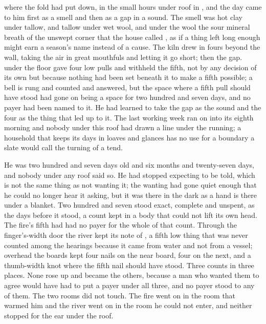 
 where the fold had put  down, in the small hours under  roof in , and the day came to him first as a smell and then as a gap in a sound. The smell was hot clay under tallow, and tallow under wet wool, and under the wool the sour mineral breath of the unswept corner that the house called , as if a thing left long enough might earn a season's name instead of a cause. The kiln drew in fours beyond the wall, taking the air in great mouthfuls and letting it go short; then the gap.  under the floor gave four low pulls and withheld the fifth, not by any decision of its own but because nothing had been set beneath it to make a fifth possible; a bell is rung and counted and answered, but the space where a fifth pull should have stood had gone on being a space for two hundred and seven days, and no payer had been named to it. He had learned to take the gap as the sound and the four as the thing that led up to it. The last working week ran on into its eighth morning and nobody under this roof had drawn a line under the running; a household that keeps its days in loaves and glances has no use for a boundary a slate would call the turning of a tend.

He was two hundred and seven days old and six months and twenty-seven days, and nobody under any roof said so. He had stopped expecting to be told, which is not the same thing as not wanting it; the wanting had gone quiet enough that he could no longer hear it asking, but it was there in the dark as a hand is there under a blanket. Two hundred and seven stood exact, complete and unspent, as the days before it stood, a count kept in a body that could not lift its own head. The fire's fifth had had no payer for the whole of that count. Through the finger's-width door the river kept its note of , a fifth low thing that was never counted among the hearings because it came from water and not from a vessel; overhead the boards kept four nails on the near board, four on the next, and a thumb-width knot where the fifth nail should have stood. Three counts in three places. None rose up and became the others, because a man who wanted them to agree would have had to put a payer under all three, and no payer stood to any of them. The two rooms did not touch. The fire went on in the room that warmed him and the river went on in the room he could not enter, and neither stopped for the ear under the roof.


